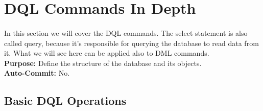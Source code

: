 
\section{\acs{DQL} Commands In Depth}
\paragraph{} In this section we will cover the \acf{DQL} commands. The select statement is also called query, because it's responsible for querying the database to read data from it. What we will see here can be applied also to \acs{DML} commands.\\\textbf{Purpose:} Define the structure of the database and its objects.\\\textbf{Auto-Commit:} No.
\subsection{Basic DQL Operations}
